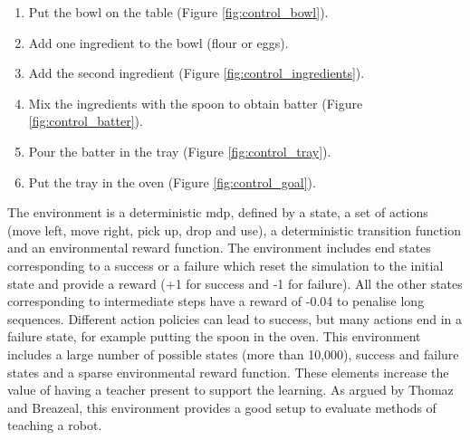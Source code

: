 \begin{enumerate}
	\item Put the bowl on the table (Figure \ref{fig:control_bowl}).
	\item Add one ingredient to the bowl (flour or eggs).
	\item Add the second ingredient (Figure \ref{fig:control_ingredients}).
	\item Mix the ingredients with the spoon to obtain batter (Figure \ref{fig:control_batter}).
	\item Pour the batter in the tray (Figure \ref{fig:control_tray}).
	\item Put the tray in the oven (Figure \ref{fig:control_goal}).
\end{enumerate}

The environment is a deterministic \gls{mdp}, defined by a state, a set of actions (move left, move right, pick up, drop and use), a deterministic transition function and an environmental reward function. The environment includes end states corresponding to a success or a failure which reset the simulation to the initial state and provide a reward (+1 for success and -1 for failure). All the other states corresponding to intermediate steps have a reward of -0.04 to penalise long sequences. Different action policies can lead to success, but many actions end in a failure state, for example putting the spoon in the oven. This environment includes a large number of possible states (more than 10,000), success and failure states and a sparse environmental reward function. These elements increase the value of having a teacher present to support the learning. As argued by Thomaz and Breazeal, this environment provides a good setup to evaluate methods of teaching a robot.

